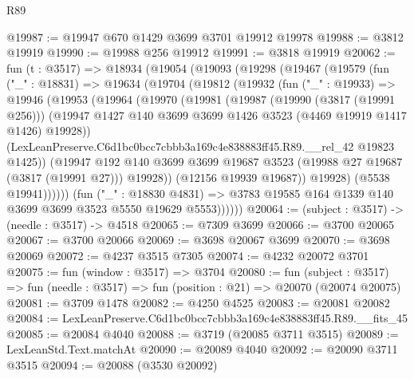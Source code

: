 \begin{lexlean}{R89}
\begin{coremodule}
@19987 := @19947 @670 @1429 @3699 @3701 @19912 @19978
@19988 := @3812 @19919
@19990 := @19988 @256 @19912
@19991 := @3818 @19919
@20062 := fun (t : @3517) =>
  @18934
    (@19054
      (@19093
        (@19298
          (@19467
            (@19579
              (fun ("_" : @18831) =>
              @19634
                (@19704
                  (@19812
                    (@19932
                      (fun ("_" : @19933) =>
                      @19946
                        (@19953
                          (@19964
                            (@19970
                              (@19981
                                (@19987
                                  (@19990 (@3817 (@19991 @256)))
                                  (@19947
                                    @1427
                                    @140
                                    @3699
                                    @3699
                                    @1426
                                    @3523
                                    (@4469 @19919 @1417 @1426)
                                    @19928))
                                (LexLeanPreserve.C6d1bc0bcc7cbbb3a169c4e838883ff45.R89.__rel_42
                                  @19823
                                  @1425))
                              (@19947
                                @192
                                @140
                                @3699
                                @3699
                                @19687
                                @3523
                                (@19988 @27 @19687 (@3817 (@19991 @27)))
                                @19928))
                            (@12156 @19939 @19687))
                          @19928)
                        (@5538 @19941))))))
              (fun ("_" : @18830 @4831) =>
              @3783 @19585 @164 @1339 @140 @3699 @3699 @3523 @5550 @19629 @5553))))))
@20064 := (subject : @3517) -> (needle : @3517) -> @4518
@20065 := @7309 @3699
@20066 := @3700 @20065
@20067 := @3700 @20066
@20069 := @3698 @20067 @3699
@20070 := @3698 @20069
@20072 := @4237 @3515 @7305
@20074 := @4232 @20072 @3701
@20075 := fun (window : @3517) => @3704
@20080 := fun (subject : @3517) =>
  fun (needle : @3517) => fun (position : @21) => @20070 (@20074 @20075)
@20081 := @3709 @1478
@20082 := @4250 @4525
@20083 := @20081 @20082
@20084 := LexLeanPreserve.C6d1bc0bcc7cbbb3a169c4e838883ff45.R89.__fits_45
@20085 := @20084 @4040
@20088 := @3719 (@20085 @3711 @3515)
@20089 := LexLeanStd.Text.matchAt
@20090 := @20089 @4040
@20092 := @20090 @3711 @3515
@20094 := @20088 (@3530 @20092)

\end{coremodule}
\end{lexlean}

